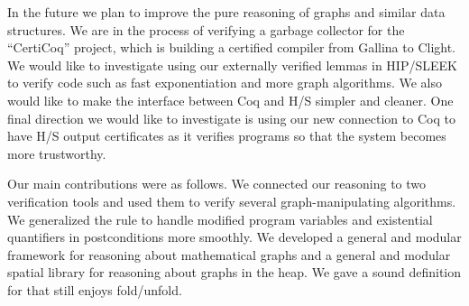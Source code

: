 In the future we plan to improve the pure reasoning of graphs and
similar data structures.  We are in the process of verifying a garbage
collector for the ``CertiCoq'' project, which is building
a certified compiler from Gallina to Clight. We would like to investigate
using our externally verified lemmas in HIP/SLEEK to verify code such as fast
exponentiation and more graph algorithms. We also would like to make
the interface between Coq and H/S simpler and cleaner.
One final direction we would like to investigate is using our new
connection to Coq to have H/S output certificates as it
verifies programs so that the system becomes more trustworthy.

Our main contributions were as follows.  We connected our reasoning
to two verification tools and used them to verify several graph-manipulating algorithms.
We generalized the 
rule to handle modified program variables and existential quantifiers in postconditions
more smoothly.  We developed a general and modular framework for reasoning
about mathematical graphs and a general and modular spatial library for
reasoning about graphs in the heap.  We gave a sound definition for 
that still enjoys fold/unfold.
